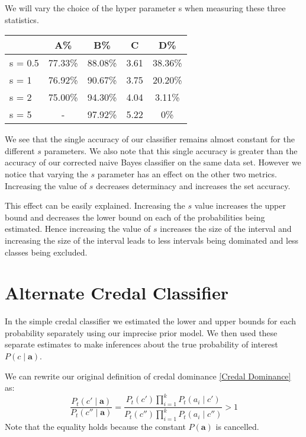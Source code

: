 We will vary the choice of the hyper parameter s when measuring these three statistics.
\begin{center}
\begin{tabular}{l|c c c c}
        & A\%     & B\%     & C    & D\%     \\
\hline
s = 0.5 & 77.33\% & 88.08\% & 3.61 & 38.36\% \\
s = 1   & 76.92\% & 90.67\% & 3.75 & 20.20\% \\
s = 2   & 75.00\% & 94.30\% & 4.04 & 3.11\% \\
s = 5   & -       & 97.92\% & 5.22 & 0\%   \\
\end{tabular}
\end{center}

We see that the single accuracy of our classifier remains almost constant for the different $s$ parameters.
We also note that this single accuracy is greater than the accuracy of our corrected naive Bayes classifier on the same data set.
However we notice that varying the $s$ parameter has an effect on the other two metrics.
Increasing the value of $s$ decreases determinacy and increases the set accuracy.

This effect can be easily explained.
Increasing the $s$ value increases the upper bound and decreases the lower bound on each of the probabilities being estimated.
Hence increasing the value of $s$ increases the size of the interval and increasing the size of the interval leads to less intervals being dominated and less classes being excluded.

\section{Alternate Credal Classifier}
In the simple credal classifier we estimated the lower and upper bounds for each probability separately using our imprecise prior model.
We then used these separate estimates to make inferences about the true probability of interest $P(c \mid \mathbf{a})$.

We can rewrite our original definition of credal dominance \cref{Credal Dominance} as:
\begin{equation}
	\frac{P_t(c' \mid \mathbf{a})}{P_t(c'' \mid \mathbf{a})} = \frac{P_t(c')\prod_{i=1}^{k}P_t(a_i \mid c')}{P_t(c'')\prod_{i=1}^{k}P_t(a_i \mid c'')} > 1
\end{equation}
Note that the equality holds because the constant $P(\mathbf{a})$ is cancelled.

